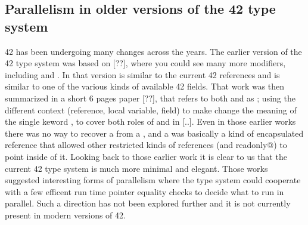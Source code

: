\subsection*{Parallelism in older versions of the 42 type system}
42 has been undergoing many changes across the years.
The earlier version of the 42 type system was based on [??],
where you could see many more modifiers, including
\Q@fresh@ and \Q@baloon@.
In that version \Q@fresh@ is similar to the current 42 \Q@capsule@ references and \Q@baloon@ is similar to one of the various kinds of available 42 \Q@capsule@ fields.
That work was then summarized in a short 6 pages paper [??], that
refers to both \Q@fresh@ and \Q@baloon@ as \Q@baloon@; using the different context (reference, local variable, field) to make change the meaning of the single keword \Q@baloon@, to cover both roles of \Q@fresh@ and \Q@baloon@ in [..].
Even in those earlier works there was no way to recover a \Q@fresh@ from a \Q@baloon@, and a \Q@baloon@ was basically a kind of encapsulated reference that allowed other restricted kinds of references (\Q@external@ and \Q@external readonly@) to point inside of it. Looking back to those earlier work it is clear to us that the current 42 type system is much more minimal and elegant.
Those works suggested interesting forms of parallelism where the type system could cooperate with a few efficent run time pointer equality checks to decide what to run in parallel.
Such a direction has not been explored further and it is not currently present in modern versions of 42.
